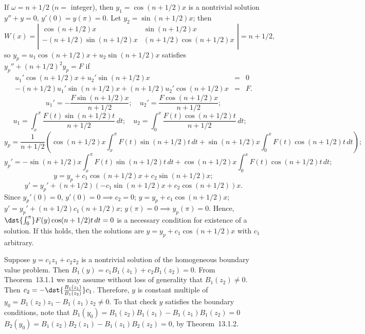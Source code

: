 \documentclass[dvips]{book}
\renewcommand{\exer}[1]{\par\medskip\;\noindent{\color{red}\bf #1.}}
\numberwithin{example}{section}
\numberwithin{equation}{section}
\numberwithin{theorem}{section}
\numberwithin{table}{section}
\numberwithin{figure}{section}
\begin{document}
If  $\omega=n+1/2$ ($n=$ integer), then $y_{1}=\cos(n+1/2)x$ is a
nontrivial solution $y''+y=0$, $y'(0)=y(\pi)=0$. Let
$y_{2}=\sin(n+1/2)x$; then
$$
W(x)=
\left|\begin{array}{ccccccc}
\cos(n+1/2)x&\sin(n+1/2)x\\
-(n+1/2)\sin(n+1/2)x&(n+1/2)\cos(n+1/2)x\\
\end{array}\right|=n+1/2,
$$
so $y_{p}=u_{1}\cos(n+1/2)x+u_{2}\sin(n+1/2)x$  satisfies
$y_{p}''+(n+1/2)^{2}y_{p}=F$ if
\begin{eqnarray*}
u_{1}'\cos(n+1/2)x+u_{2}'\sin(n+1/2)x&=&0 \\
-(n+1/2)u_{1}'\sin(n+1/2)x+(n+1/2)u_{2}'\cos(n+1/2)x&=&F.
\end{eqnarray*}
$$
u_{1}'=-\frac{F\sin(n+1/2)x}{n+1/2};\quad
u_{2}'=\frac{F\cos(n+1/2)x}{n+1/2};
$$
$$
u_{1}=\int_{x}^{\pi} \frac{F(t)\sin(n+1/2)t}{n+1/2}\,dt; \quad
u_{2}=\int_{0}^{x} \frac{F(t)\cos(n+1/2)t}{n+1/2}\,dt; \quad
$$
$$
y_{p}=\frac{1}{n+1/2}\left(
\cos(n+1/2)x\int_{x}^{\pi} F(t)\sin(n+1/2)t\,dt
+\sin(n+1/2)x
\int_{0}^{x} F(t)\cos(n+1/2)t\,dt\right);
$$
$$
y_{p}'=-
\sin(n+1/2)x\int_{x}^{\pi} F(t)\sin(n+1/2)t\,dt
+\cos(n+1/2)x
\int_{0}^{x} F(t)\cos(n+1/2)t\,dt;
$$
$$
y=y_{p}+c_{1}\cos(n+1/2)x+c_{2}\sin(n+1/2)x;
$$
$$
y'=y_{p}'+(n+1/2)(-c_{1}\sin(n+1/2)x+c_{2}\cos(n+1/2))x.
$$
Since $y_{p}'(0)=0$, $y'(0)=0\implies c_{2}=0$;
$y=y_{p}+c_{1}\cos(n+1/2)x$;  \\
$y'=y_{p}'+(n+1/2)c_{1}(n+1/2)x$; $y(\pi)=0\implies y_{p}(\pi)=0$.
Hence, $\dst{\int_{0}^{\pi}}F(y)\cos(n+1/2)t\,dt =0$
is a necessary condition for existence of a solution. If this holds,
then the solutions are $y=y_{p}+c_{1}\cos(n+1/2)x$  with $c_{1}$
arbitrary.



\exer{13.1.20}
Suppose $y=c_{1}z_{1}+c_{2}z_{2}$ is a nontrivial solution of
the homogeneous boundary value problem. Then
$B_{1}(y)=c_{1}B_{1}(z_{1})+c_{2}B_{1}(z_{2})=0$.
From Theorem~13.1.1 we may assume without loss of
generality that
$B_{1}(z_{2})\ne0$. Then
$c_{2}=-\dst{\frac{B_{1}(z_{1})}{B_{1}(z_{2})}}c_{1}$.
Therefore,   $y$ is constant multiple of
$y_{0}=B_{1}(z_{2})z_{1}-B_{1}(z_{1})z_{2}\ne0$. To that check $y$
satisfies the boundary conditions, note  that
$B_{1}(y_{0})=B_{1}(z_{2})B_{1}(z_{1})-B_{1}(z_{1})B_{1}(z_{2})=0$
$B_{2}(y_{0})=B_{1}(z_{2})B_{2}(z_{1})-B_{1}(z_{1})B_{2}(z_{2})=0$,
by Theorem~13.1.2.
\end{document}
